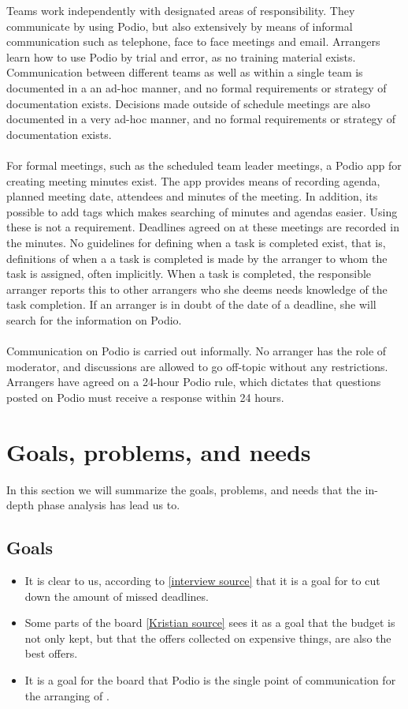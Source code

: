 Teams work independently with designated areas of responsibility. They communicate by using Podio, but also extensively by means of informal communication such as telephone, face to face meetings and email. Arrangers learn how to use Podio by trial and error, as no training material exists. Communication between different teams as well as within a single team is documented in a an ad-hoc manner, and no formal requirements or strategy of documentation exists. Decisions made outside of schedule meetings are also documented in a very ad-hoc manner, and no formal requirements or strategy of documentation exists.
\\ \\
For formal meetings, such as the scheduled team leader meetings, a Podio app for creating meeting minutes exist. The app provides means of recording agenda, planned meeting date, attendees and minutes of the meeting. In addition, its possible to add tags which makes searching of minutes and agendas easier. Using these is not a requirement. Deadlines agreed on at these meetings are recorded in the minutes. No guidelines for defining when a task is completed exist, that is, definitions of when a a task is completed is made by the arranger to whom the task is assigned, often implicitly. When a task is completed, the responsible arranger reports this to other arrangers who she deems needs knowledge of the task completion. If an arranger is in doubt of the date of a deadline, she will search for the information on Podio.
\\ \\
Communication on Podio is carried out informally. No arranger has the role of moderator, and discussions are allowed to go off-topic without any restrictions. Arrangers have agreed on a 24-hour Podio rule, which dictates that questions posted on Podio must receive a response within 24 hours.



\section{Goals, problems, and needs}
\label{sec:goprne}
In this section we will summarize the goals, problems, and needs that the
in-depth phase analysis has lead us to.

\subsection{Goals}
\label{subsec:goals}
\begin{itemize}
    \item It is clear to us, according to \ref{interview source} that it is a goal for \mil  to cut down the amount of missed deadlines.
    \item Some parts of the board \ref{Kristian source} sees it as a goal that the
    budget is not only kept, but that the offers collected on expensive things, are
    also the best offers.
    \item It is a goal for the board that Podio is the single point of communication
    for the arranging of \mil.
\end{itemize}

